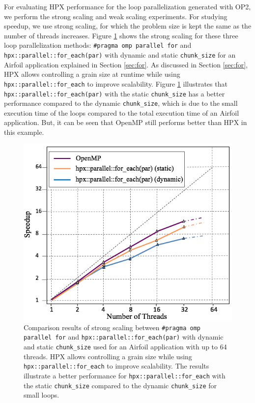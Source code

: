 \documentclass[conference]{IEEEtran}
\begin{document}
For evaluating HPX performance for the loop parallelization generated with OP2, we perform the strong scaling and weak scaling experiments. For studying speedup, we use strong scaling, for which the problem size is kept the same as the number of threads increases. Figure \ref{f1} shows the strong scaling for these three loop parallelization methods: \texttt{\#pragma omp parallel for} and \texttt{hpx::parallel::for\_each(par)} with dynamic and static \texttt{chunk\_size} for an Airfoil application explained in Section \ref{sec:for}. As discussed in Section \ref{sec:for}, HPX allows controlling a grain size at runtime while using \texttt{hpx::parallel::for\_each} to improve scalability. Figure \ref{f1} illustrates that \texttt{hpx::parallel::for\_each(par)} with the static \texttt{chunk\_size} has a better performance compared to the dynamic \texttt{chunk\_size}, which is due to the small execution time of the loops compared to the total execution time of an Airfoil application. But, it can be seen that OpenMP still performs better than HPX in this example.



\begin{figure} 
\begin{center}
\centering
\includegraphics[width=1\columnwidth]{Pictures/parallel_for_each.jpg}
\caption {\small{Comparison results of strong scaling between \texttt{\#pragma omp parallel for} and \texttt{hpx::parallel::for\_each(par)} with dynamic and static \texttt{chunk\_size} used for an Airfoil application
with up to 64 threads. HPX allows controlling a grain size while using \texttt{hpx::parallel::for\_each} to improve scalability. The results illustrate a better performance for \texttt{hpx::parallel::for\_each} with the static \texttt{chunk\_size} compared to the dynamic \texttt{chunk\_size} for small loops. }}
\label{f1}
\end{center}
\end{figure}
\end{document}
